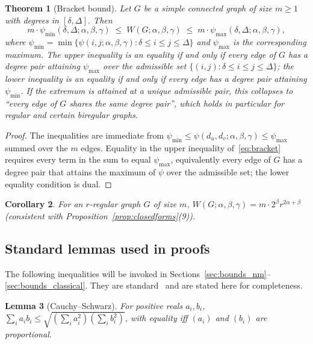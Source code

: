 \documentclass[11pt,a4paper]{article}
\newtheorem{theorem}{Theorem}[section]
\newtheorem{lemma}[theorem]{Lemma}
\newtheorem{corollary}[theorem]{Corollary}
\theoremstyle{definition}
\newcommand{\Wuzi}{W(G;\alpha,\beta,\gamma)}
\begin{document}
\begin{theorem}[Bracket bound]\label{thm:bracket}
Let $G$ be a simple connected graph of size $m\ge 1$ with degrees
in $[\delta,\Delta]$. Then
\begin{equation}\label{eq:bracket}
m\cdot \psi_{\min}(\delta,\Delta;\alpha,\beta,\gamma)
\;\le\; \Wuzi \;\le\;
m\cdot \psi_{\max}(\delta,\Delta;\alpha,\beta,\gamma),
\end{equation}
where
$\psi_{\min}=\min\{\psi(i,j;\alpha,\beta,\gamma):\delta\le i\le j\le\Delta\}$
and $\psi_{\max}$ is the corresponding maximum.
The upper inequality is an equality if and only if every edge of
$G$ has a degree pair attaining $\psi_{\max}$ over the admissible
set $\{(i, j) : \delta \le i \le j \le \Delta\}$; the lower
inequality is an equality if and only if every edge has a degree
pair attaining $\psi_{\min}$. If the extremum is attained at a
unique admissible pair, this collapses to ``every edge of $G$
shares the same degree pair'', which holds in particular for
regular and certain biregular graphs.
\end{theorem}

\begin{proof}
The inequalities are immediate from
$\psi_{\min}\le \psi(d_u,d_v;\alpha,\beta,\gamma)\le \psi_{\max}$
summed over the $m$ edges. Equality in the upper inequality
of~\eqref{eq:bracket} requires every term in the sum to equal
$\psi_{\max}$, equivalently every edge of $G$ has a degree pair
that attains the maximum of $\psi$ over the admissible set;
the lower equality condition is dual.
\end{proof}

\begin{corollary}\label{cor:regular_value}
For an $r$-regular graph $G$ of size $m$,
$\Wuzi = m\cdot 2^{\beta} r^{2\alpha+\beta}$
(consistent with Proposition~\ref{prop:closedforms}(9)).
\end{corollary}

\subsection{Standard lemmas used in proofs}\label{sec:lemmas}

The following inequalities will be invoked in
Sections~\ref{sec:bounds_nm}--\ref{sec:bounds_classical}. They are
standard~\cite{HardyLittlewoodPolya1934} and are stated here for
completeness.

\begin{lemma}[Cauchy--Schwarz]\label{lem:cs}
For positive reals $a_i,b_i$,
\(\sum_i a_i b_i \le \sqrt{(\sum_i a_i^2)(\sum_i b_i^2)}\),
with equality iff $(a_i)$ and $(b_i)$ are proportional.
\end{lemma}
\end{document}
